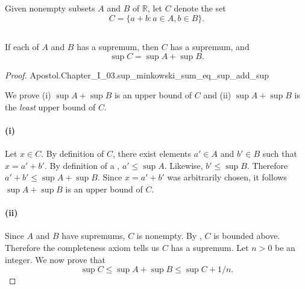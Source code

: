 \documentclass{report}
\begin{document}
Given nonempty subsets $A$ and $B$ of $\mathbb{R}$, let $C$ denote the set
  $$C = \{a + b : a \in A, b \in B\}.$$


\subsection{}%
\label{sub:theorem-i.33a}

\begin{theorem}[I.33a]

  If each of $A$ and $B$ has a supremum, then $C$ has a supremum, and
    $$\sup{C} = \sup{A} + \sup{B}.$$

\end{theorem}

\begin{proof}

    {Apostol.Chapter\_I\_03.sup\_minkowski\_sum\_eq\_sup\_add\_sup}

  We prove (i) $\sup{A} + \sup{B}$ is an upper bound of $C$ and (ii)
    $\sup{A} + \sup{B}$ is the \textit{least} upper bound of $C$.

  \paragraph{(i)}%
  \label{par:theorem-i.33a-i}

    Let $x \in C$.
    By definition of $C$, there exist elements $a' \in A$ and $b' \in B$ such
      that $x = a' + b'$.
    By definition of a , $a' \leq \sup{A}$.
    Likewise, $b' \leq \sup{B}$.
    Therefore $a' + b' \leq \sup{A} + \sup{B}$.
    Since $x = a' + b'$ was arbitrarily chosen, it follows $\sup{A} + \sup{B}$
      is an upper bound of $C$.

  \paragraph{(ii)}%

    Since $A$ and $B$ have supremums, $C$ is nonempty.
    By , $C$ is bounded above.
    Therefore the completeness axiom tells us $C$ has a supremum.
    Let $n > 0$ be an integer.
    We now prove that
      \begin{equation}
        \label{par:theorem-i.33a-ii-eq1}
        \sup{C} \leq \sup{A} + \sup{B} \leq \sup{C} + 1 / n.
      \end{equation}


\end{proof}
\end{document}
